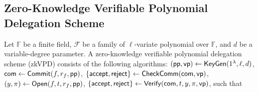 
\subsection{Zero-Knowledge Verifiable Polynomial Delegation Scheme}
\label{subsec::zkvpd}

Let $\mathbb{F}$ be a finite field, $\mathcal{F}$ be a family of $\ell$-variate polynomial over $\mathbb{F}$, and $d$ be a variable-degree parameter. A zero-knowledge verifiable polynomial delegation scheme (zkVPD) consists of the following algorithms: $(\mathsf{pp}, \mathsf{vp}) \leftarrow \mathsf{KeyGen}(1^\lambda, \ell, d)$, ${{\sf com}} \leftarrow \mathsf{Commit}(f, r_f, \mathsf{pp})$, $\{\mathsf{accept},\mathsf{reject}\}\leftarrow\mathsf{CheckComm}({{\sf com}}, \mathsf{vp})$, $(y,\pi)\leftarrow\mathsf{Open}(f,t,r_f,\mathsf{pp})$, $\{\mathsf{accept},\mathsf{reject}\}\leftarrow\mathsf{Verify}({{\sf com}},t,y,\pi,\mathsf{vp})$, such that

